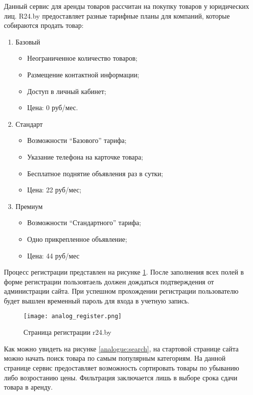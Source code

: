 Данный сервис для аренды товаров рассчитан на покупку товаров у юридических лиц.
R24.by предоставляет разные тарифные планы для компаний, которые собираются продать товар:
\begin{enumerate}
  \item Базовый
  \begin{itemize}
    \item Неограниченное количество товаров;
    \item Размещение контактной информации;
    \item Доступ в личный кабинет;
    \item Цена: 0 руб/мес.
  \end{itemize}
  \item Стандарт
  \begin{itemize}
    \item Возможности “Базового” тарифа;
    \item Указание телефона на карточке товара;
    \item Бесплатное поднятие объявления раз в сутки;
    \item Цена: 22 руб/мес;
  \end{itemize}
  \item Премиум
  \begin{itemize}
    \item Возможности “Стандартного” тарифа;
    \item Одно прикрепленное объявление;
    \item Цена: 44 руб/мес
  \end{itemize}
\end{enumerate}
\bigbreak

Процесс регистрации представлен на рисунке \ref{analogue:reg}.
После заполнения всех полей в форме регистрации пользовтаель должен дождаться подтверждения от администрации сайта.
При успешном прохождении регистрации пользователю будет вышлен временный пароль для входа в учетную запись.

\begin{figure}[!ht]
  \centering
      \texttt{[image: analog\_register.png]}
      \caption{Страница регистрации r24.by}
      \label{analogue:reg}
\end{figure}

Как можно увидеть на рисунке \ref{analogue:search}, на стартовой странице сайта можно начать поиск товара по самым популярным категориям.
На данной странице сервис предоставляет возможность сортировать товары по убыванию либо возростанию цены.
Фильтрация заключается лишь в выборе срока сдачи товара в аренду.

